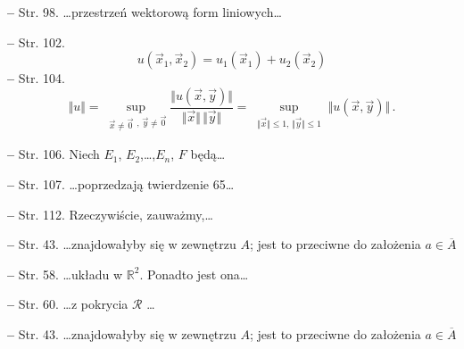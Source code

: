 \documentclass[a4paper]{article}
\newcommand{\tb}{\textbf}
\newcommand{\noi}{\noindent}
\newcommand{\start}{\noi \tb{--} {}}
\begin{document}
\start Str. 98. \ldots przestrzeń wektorową form liniowych\ldots

\start Str. 102.
$$u(\vec{x}_{1},\vec{x}_{2})=u_{1}(\vec{x}_{1})+u_{2}(\vec{x}_{2})$$
\start Str. 104.
$$\Vert u \Vert = \sup_{ \substack{ \vec{ x } \neq \vec{ 0 } },
  \,\vec{ y } \neq \vec{ 0 } } \frac{ \Vert u( \vec x, \vec y ) \Vert
}{ \Vert \vec{ x } \Vert \, \Vert \vec y \Vert } = \sup_{ \substack{
    \Vert \vec{ x } \Vert \leq 1, \, \Vert \vec{ y } \Vert \leq 1 } }
\Vert u( \vec x, \vec y ) \Vert \, .$$

\start Str. 106. Niech $E_{ 1 }$, $E_{ 2 }$,\ldots,$E_{ n }$, $F$
będą\ldots

\start Str. 107. \ldots poprzedzają twierdzenie 65\ldots

\start Str. 112. Rzeczywiście, zauważmy,\ldots

\start Str. 43. \ldots znajdowałyby się w zewnętrzu $A$; jest to
przeciwne do założenia $a \in \overline{ A }$

\start Str. 58. \ldots układu w $\mathbb{R}^{ 2 }$. Ponadto jest
ona\ldots

\start Str. 60. \ldots z pokrycia $\mathcal{R}$ \ldots

\start Str. 43. \ldots znajdowałyby się w zewnętrzu $A$; jest to
przeciwne do założenia $a \in \overline{ A }$
\end{document}
